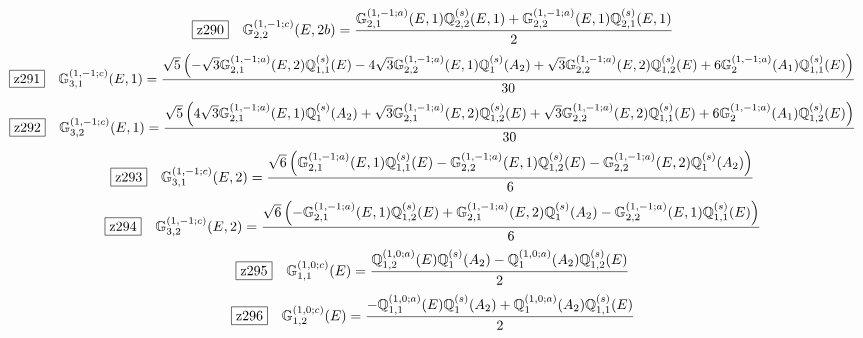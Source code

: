 \documentclass[fleqn,10pt,landscape]{jsarticle}
\begin{document}
\begin{dmath*}
\hspace*{3mm}\fbox{z290}\quad \mathbb{G}_{2,2}^{(1,-1;c)}(E,2b)=\frac{\mathbb{G}_{2,1}^{(1,-1;a)}(E,1) \mathbb{Q}_{2,2}^{(s)}(E,1) + \mathbb{G}_{2,2}^{(1,-1;a)}(E,1) \mathbb{Q}_{2,1}^{(s)}(E,1)}{2}
\end{dmath*}
\begin{dmath*}
\hspace*{3mm}\fbox{z291}\quad \mathbb{G}_{3,1}^{(1,-1;c)}(E,1)=\frac{\sqrt{5} \left(- \sqrt{3} \mathbb{G}_{2,1}^{(1,-1;a)}(E,2) \mathbb{Q}_{1,1}^{(s)}(E) - 4 \sqrt{3} \mathbb{G}_{2,2}^{(1,-1;a)}(E,1) \mathbb{Q}_{1}^{(s)}(A_{2}) + \sqrt{3} \mathbb{G}_{2,2}^{(1,-1;a)}(E,2) \mathbb{Q}_{1,2}^{(s)}(E) + 6 \mathbb{G}_{2}^{(1,-1;a)}(A_{1}) \mathbb{Q}_{1,1}^{(s)}(E)\right)}{30}
\end{dmath*}
\begin{dmath*}
\hspace*{3mm}\fbox{z292}\quad \mathbb{G}_{3,2}^{(1,-1;c)}(E,1)=\frac{\sqrt{5} \left(4 \sqrt{3} \mathbb{G}_{2,1}^{(1,-1;a)}(E,1) \mathbb{Q}_{1}^{(s)}(A_{2}) + \sqrt{3} \mathbb{G}_{2,1}^{(1,-1;a)}(E,2) \mathbb{Q}_{1,2}^{(s)}(E) + \sqrt{3} \mathbb{G}_{2,2}^{(1,-1;a)}(E,2) \mathbb{Q}_{1,1}^{(s)}(E) + 6 \mathbb{G}_{2}^{(1,-1;a)}(A_{1}) \mathbb{Q}_{1,2}^{(s)}(E)\right)}{30}
\end{dmath*}
\begin{dmath*}
\hspace*{3mm}\fbox{z293}\quad \mathbb{G}_{3,1}^{(1,-1;c)}(E,2)=\frac{\sqrt{6} \left(\mathbb{G}_{2,1}^{(1,-1;a)}(E,1) \mathbb{Q}_{1,1}^{(s)}(E) - \mathbb{G}_{2,2}^{(1,-1;a)}(E,1) \mathbb{Q}_{1,2}^{(s)}(E) - \mathbb{G}_{2,2}^{(1,-1;a)}(E,2) \mathbb{Q}_{1}^{(s)}(A_{2})\right)}{6}
\end{dmath*}
\begin{dmath*}
\hspace*{3mm}\fbox{z294}\quad \mathbb{G}_{3,2}^{(1,-1;c)}(E,2)=\frac{\sqrt{6} \left(- \mathbb{G}_{2,1}^{(1,-1;a)}(E,1) \mathbb{Q}_{1,2}^{(s)}(E) + \mathbb{G}_{2,1}^{(1,-1;a)}(E,2) \mathbb{Q}_{1}^{(s)}(A_{2}) - \mathbb{G}_{2,2}^{(1,-1;a)}(E,1) \mathbb{Q}_{1,1}^{(s)}(E)\right)}{6}
\end{dmath*}
\begin{dmath*}
\hspace*{3mm}\fbox{z295}\quad \mathbb{G}_{1,1}^{(1,0;c)}(E)=\frac{\mathbb{Q}_{1,2}^{(1,0;a)}(E) \mathbb{Q}_{1}^{(s)}(A_{2}) - \mathbb{Q}_{1}^{(1,0;a)}(A_{2}) \mathbb{Q}_{1,2}^{(s)}(E)}{2}
\end{dmath*}
\begin{dmath*}
\hspace*{3mm}\fbox{z296}\quad \mathbb{G}_{1,2}^{(1,0;c)}(E)=\frac{- \mathbb{Q}_{1,1}^{(1,0;a)}(E) \mathbb{Q}_{1}^{(s)}(A_{2}) + \mathbb{Q}_{1}^{(1,0;a)}(A_{2}) \mathbb{Q}_{1,1}^{(s)}(E)}{2}
\end{dmath*}
\end{document}
